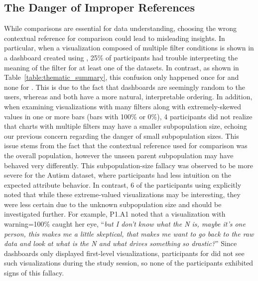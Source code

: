 \subsection{The Danger of Improper References}
\par While comparisons are essential for data understanding, choosing the wrong contextual reference for comparison could lead to misleading insights. In particular, when a visualization composed of multiple filter conditions is shown in a dashboard created using \cluster, 25\% of participants had trouble interpreting the meaning of the filter for at least one of the datasets. In contrast, as shown in Table~\ref{table:thematic_summary}, this confusion only happened once for \BFS and none for \system. This is due to the fact that \cluster dashboards are seemingly random to the users, whereas \BFS and \system both have a more natural, interpretable ordering. In addition, when examining visualizations with many filters along with extremely-skewed values in one or more bars (bars with 100\% or 0\%), 4 \cluster participants did not realize that charts with multiple filters may have a smaller subpopulation size, echoing our previous concern regarding the danger of small subpopulation sizes. This issue stems from the fact that the contextual reference used for comparison was the overall population, however the unseen parent subpopulation may have behaved very differently. This subpopulation-size fallacy was observed to be more severe for the Autism dataset, where participants had less intuition on the expected attribute behavior. In contrast, 6 of the participants using \system explicitly noted that while these extreme-valued visualizations may be interesting, they were less certain due to the unknown subpopulation size and should be investigated further. For example, P1.A1 noted that a visualization with warning=100\% caught her eye, ``\textit{but I don't know what the N is, maybe it's one person, this makes me a little skeptical, that makes me want to go back to the raw data and look at what is the N and what drives something so drastic?}'' Since \BFS dashboards only displayed first-level visualizations, participants for \BFS did not see such visualizations during the study session, so none of the \BFS participants exhibited signs of this fallacy.

